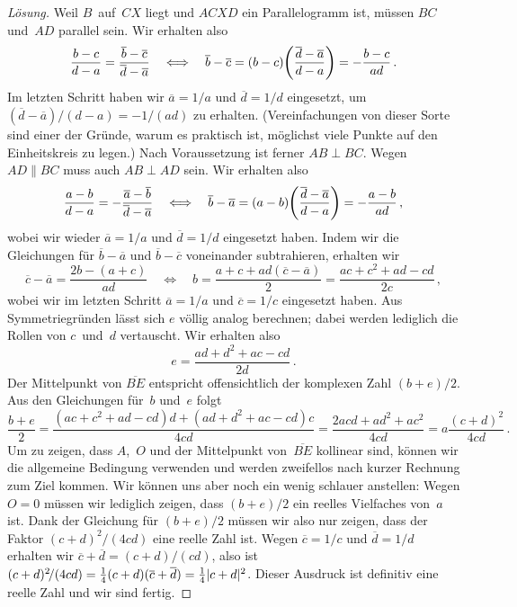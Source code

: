 \begin{proof}[Lösung]
	Weil $B$~auf~$CX$ liegt und $ACXD$ ein Parallelogramm ist, müssen $BC$ und~$AD$ parallel sein. Wir erhalten also
	\begin{equation*}%
		\frac{b-c}{d-a}=\frac{\overline{b}-\overline{c}}{\overline{d}-\overline{a}}\quad\Longleftrightarrow\quad \overline{b}-\overline{c}=(b-c)\parens*{\frac{\overline{d}-\overline{a}}{d-a}}=-\frac{b-c}{ad}\,.
	\end{equation*}
	Im letzten Schritt haben wir $\overline{a}=1/a$ und $\overline{d}=1/d$ eingesetzt, um $(\overline{d}-\overline{a})/(d-a)=-1/(ad)$ zu erhalten. (Vereinfachungen von dieser Sorte sind einer der Gründe, warum es praktisch ist, möglichst viele Punkte auf den Einheitskreis zu legen\@.) Nach Voraussetzung ist ferner $AB\perp BC$. Wegen $AD\parallel BC$ muss auch $AB\perp AD$ sein. Wir erhalten also
	\begin{equation*}%
		\frac{a-b}{d-a}=-\frac{\overline{a}-\overline{b}}{\overline{d}-\overline{a}}\quad\Longleftrightarrow \quad \overline{b}-\overline{a}=(a-b)\parens*{\frac{\overline{d}-\overline{a}}{d-a}}=-\frac{a-b}{ad}\,,
	\end{equation*}
	wobei wir wieder $\overline{a}=1/a$ und $\overline{d}=1/d$ eingesetzt haben. Indem wir die Gleichungen für $\overline{b}-\overline{a}$ und $\overline{b}-\overline{c}$ voneinander subtrahieren, erhalten wir
	\begin{equation*}%
		\overline{c}-\overline{a}=\frac{2b-(a+c)}{ad}\quad\Longleftrightarrow\quad b=\frac{a+c+ad(\overline{c}-\overline{a})}{2}=\frac{ac+c^2+ad-cd}{2c}\,,
	\end{equation*}
	wobei wir im letzten Schritt $\overline{a}=1/a$ und $\overline{c}=1/c$ eingesetzt haben. Aus Symmetriegründen lässt sich $e$ völlig analog berechnen; dabei werden lediglich die Rollen von $c$~und~$d$ vertauscht. Wir erhalten also
	\begin{equation*}%
		e=\frac{ad+d^2+ac-cd}{2d}\,.
	\end{equation*}
	Der Mittelpunkt von $\overline{BE}$ entspricht offensichtlich der komplexen Zahl $(b+e)/2$. Aus den Gleichungen für~$b$ und~$e$ folgt
	\begin{equation*}%
		\frac{b+e}{2}=\frac{(ac+c^2+ad-cd)d+(ad+d^2+ac-cd)c}{4cd}=\frac{2acd+ad^2+ac^2}{4cd}=a\frac{(c+d)^2}{4cd}\,.
	\end{equation*}
	Um zu zeigen, dass $A$,~$O$ und der Mittelpunkt von~$\overline{BE}$ kollinear sind, können wir die allgemeine Bedingung verwenden und werden zweifellos nach kurzer Rechnung zum Ziel kommen. Wir können uns aber noch ein wenig schlauer anstellen: Wegen $O=0$ müssen wir lediglich zeigen, dass $(b+e)/2$ ein reelles Vielfaches von~$a$ ist. Dank der Gleichung für $(b+e)/2$ müssen wir also nur zeigen, dass der Faktor $(c+d)^2\!/(4cd)$ eine reelle Zahl ist. Wegen $\overline{c}=1/c$ und $\overline{d}=1/d$ erhalten wir $\overline{c}+\overline{d}=(c+d)/(cd)$, also ist $(c+d)^2\!/(4cd)=\frac14(c+d)(\overline{c}+\overline{d})=\frac 14\lvert c+d\rvert^2$. Dieser Ausdruck ist definitiv eine reelle Zahl und wir sind fertig.
\end{proof}